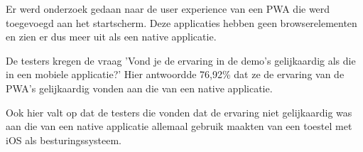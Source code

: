 		Er werd onderzoek gedaan naar de user experience van een PWA die werd toegevoegd aan het startscherm. Deze applicaties hebben geen browserelementen en zien er dus meer uit als een native applicatie.
		
		
		De testers kregen de vraag 'Vond je de ervaring in de demo's gelijkaardig als die in een mobiele applicatie?' Hier antwoordde 76,92\% dat ze de ervaring van de PWA's gelijkaardig vonden aan die van een native applicatie.
		
		Ook hier valt op dat de testers die vonden dat de ervaring niet gelijkaardig was aan die van een native applicatie allemaal gebruik maakten van een toestel met iOS als besturingssysteem.
		

		
	
	
	
	
			
		
